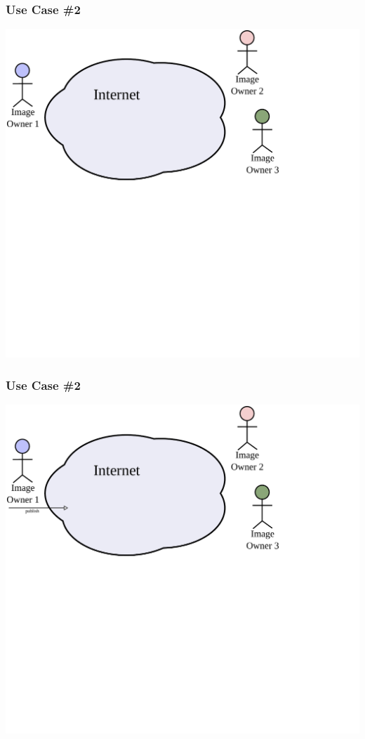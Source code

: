 \documentclass[mathserif,xcolor=dvipsnames,hyperref={bookmarks=true}]{beamer}
\begin{document}
    \begin{frame}[t]
        \frametitle{Use Case \#2}
        \begin{center}
            \includegraphics[width=0.9\textheight]{../resources/usecases/usecase2/usecase2-step04.pdf}
        \end{center}
    \end{frame}
    \begin{frame}[t]
        \frametitle{Use Case \#2}
        \begin{center}
            \includegraphics[width=0.9\textheight]{../resources/usecases/usecase2/usecase2-step05.pdf}
        \end{center}
    \end{frame}
\end{document}
